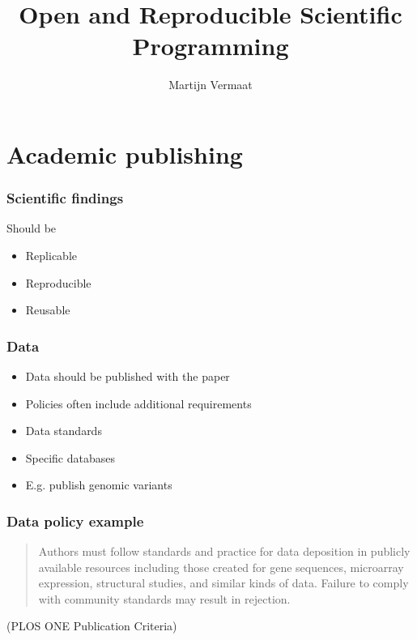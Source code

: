 \documentclass[slidestop]{beamer}
\title{Open and Reproducible Scientific Programming}
\author{Martijn Vermaat}
\begin{document}

\bodytemplate



\section{Academic publishing}

\begin{frame}
  \frametitle{Scientific findings}
  Should be
  \begin{itemize}
    \item Replicable

    \item Reproducible

    \item Reusable

  \end{itemize}
\end{frame}

\begin{frame}
  \frametitle{Data}
  \begin{itemize}[<+->]
    \item Data should be published with the paper
    \item Policies often include additional requirements
    \item Data standards
    \item Specific databases
    \item E.g. publish genomic variants
  \end{itemize}
\end{frame}

\begin{frame}
  \frametitle{Data policy example}
  \begin{quote}
    Authors must follow standards and practice for data deposition in
    publicly available resources including those created for gene sequences,
    microarray expression, structural studies, and similar kinds of
    data. Failure to comply with community standards may result in rejection.
  \end{quote}
  (PLOS ONE Publication Criteria)
\end{frame}
\end{document}
